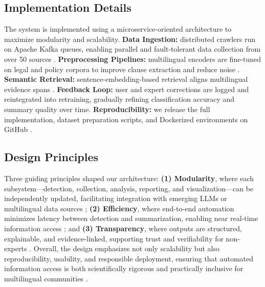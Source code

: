 {\subsection{Implementation Details}
The system is implemented using a microservice-oriented architecture to maximize modularity and scalability. \textbf{Data Ingestion:} distributed crawlers run on Apache Kafka queues, enabling parallel and fault-tolerant data collection from over 50 sources \cite{niklaus2023multilegal}. \textbf{Preprocessing Pipelines:} multilingual encoders are fine-tuned on legal and policy corpora to improve clause extraction and reduce noise \cite{devlin2019bert, conneau2020xlmr}. \textbf{Semantic Retrieval:} sentence-embedding-based retrieval aligns multilingual evidence spans \cite{reimers2019sbert, reimers2020multilingual}. \textbf{Feedback Loop:} user and expert corrections are logged and reintegrated into retraining, gradually refining classification accuracy and summary quality over time. \textbf{Reproducibility:} we release the full implementation, dataset preparation scripts, and Dockerized environments on GitHub \cite{mitchell2021modelcards}.



\subsection{Design Principles}
Three guiding principles shaped our architecture: \textbf{(1) Modularity}, where each subsystem—detection, collection, analysis, reporting, and visualization—can be independently updated, facilitating integration with emerging LLMs or multilingual data sources \cite{devlin2019bert, conneau2020xlmr}; \textbf{(2) Efficiency}, where end-to-end automation minimizes latency between detection and summarization, enabling near real-time information access \cite{reimers2019sbert, lewis2020rag}; and \textbf{(3) Transparency}, where outputs are structured, explainable, and evidence-linked, supporting trust and verifiability for non-experts \cite{mitchell2021modelcards, maynez2020faithfulness}. Overall, the design emphasizes not only scalability but also reproducibility, usability, and responsible deployment, ensuring that automated information access is both scientifically rigorous and practically inclusive for multilingual communities \cite{weidinger2021taxonomy, bommasani2021foundation}.


}
